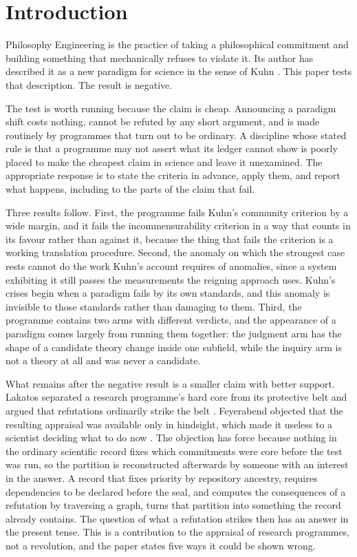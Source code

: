 \documentclass[11pt,letterpaper]{article}
\begin{document}
\section{Introduction}

Philosophy Engineering is the practice of taking a philosophical commitment and
building something that mechanically refuses to violate it. Its author has
described it as a new paradigm for science in the sense of Kuhn
\citep{kuhn1970}. This paper tests that description. The result is negative.

The test is worth running because the claim is cheap. Announcing a paradigm
shift costs nothing, cannot be refuted by any short argument, and is made
routinely by programmes that turn out to be ordinary. A discipline whose stated
rule is that a programme may not assert what its ledger cannot show is poorly
placed to make the cheapest claim in science and leave it unexamined. The
appropriate response is to state the criteria in advance, apply them, and report
what happens, including to the parts of the claim that fail.

Three results follow. First, the programme fails Kuhn's community criterion by a
wide margin, and it fails the incommensurability criterion in a way that counts
in its favour rather than against it, because the thing that fails the criterion
is a working translation procedure. Second, the anomaly on which the strongest
case rests cannot do the work Kuhn's account requires of anomalies, since a
system exhibiting it still passes the measurements the reigning approach uses.
Kuhn's crises begin when a paradigm fails by its own standards, and this
anomaly is invisible to those standards rather than damaging to them. Third, the
programme contains two arms with different verdicts, and the appearance of a
paradigm comes largely from running them together: the judgment arm has the
shape of a candidate theory change inside one subfield, while the inquiry arm is
not a theory at all and was never a candidate.

What remains after the negative result is a smaller claim with better support.
Lakatos separated a research programme's hard core from its protective belt and
argued that refutations ordinarily strike the belt \citep{lakatos1970}.
Feyerabend objected that the resulting appraisal was available only in hindsight,
which made it useless to a scientist deciding what to do now
\citep{feyerabend1975}. The objection has force because nothing in the ordinary
scientific record fixes which commitments were core before the test was run, so
the partition is reconstructed afterwards by someone with an interest in the
answer. A record that fixes priority by repository ancestry, requires
dependencies to be declared before the seal, and computes the consequences of a
refutation by traversing a graph, turns that partition into something the record
already contains. The question of what a refutation strikes then has an answer
in the present tense. This is a contribution to the appraisal of research
programmes, not a revolution, and the paper states five ways it could be shown
wrong.
\end{document}
